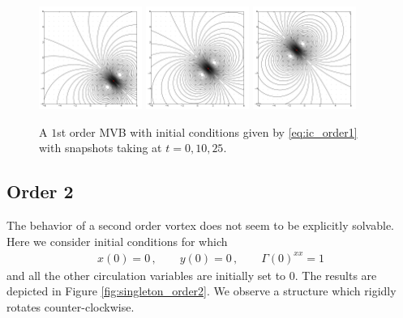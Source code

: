 \documentclass[12pt]{amsart}
\theoremstyle{remark}
\begin{document}
\begin{figure}[h!]
	\centering
	\includegraphics[width = 0.3\textwidth]{./images/singleton_order1/order_1_time_0}
	\includegraphics[width = 0.3\textwidth]{./images/singleton_order1/order_1_time_10}
	\includegraphics[width = 0.3\textwidth]{./images/singleton_order1/order_1_time_25}
	\caption{A $1$st order MVB with initial conditions given by \eqref{eq:ic_order1}
		with snapshots taking at $t=0,10,25$.}
	\label{fig:singleton_order1}
\end{figure}

\subsection{Order 2}
The behavior of a second order vortex does not seem to be explicitly solvable.
Here we consider initial conditions for which 
\begin{align}
	x(0) = 0 \,,\quad\quad y(0) = 0 \,,\quad\quad \Gamma(0)^{xx} = 1 \label{eq:ic_order2}
\end{align}
and all the other circulation variables are initially set to $0$.
The results are depicted in Figure \ref{fig:singleton_order2}.
We observe a structure which rigidly rotates counter-clockwise.
\end{document}
